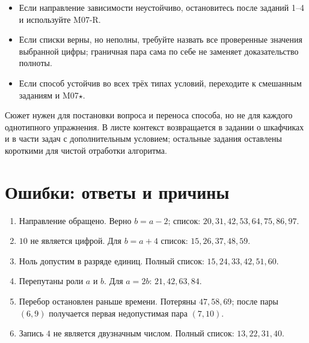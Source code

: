 \begin{teacherbox}
  \begin{itemize}
    \item Если направление зависимости неустойчиво, остановитесь после
      заданий 1--4 и используйте M07-R.
    \item Если списки верны, но неполны, требуйте назвать все проверенные
      значения выбранной цифры; граничная пара сама по себе не заменяет
      доказательство полноты.
    \item Если способ устойчив во всех трёх типах условий, переходите к
      смешанным заданиям и M07\(\star\).
  \end{itemize}
\end{teacherbox}

\begin{teacherbox}
  Сюжет нужен для постановки вопроса и переноса способа, но не для каждого
  однотипного упражнения. В листе контекст возвращается в задании о шкафчиках
  и в части задач с дополнительным условием; остальные задания оставлены
  короткими для чистой отработки алгоритма.
\end{teacherbox}

\section{Ошибки: ответы и причины}

\begin{enumerate}
  \item Направление обращено. Верно \(b=a-2\); список:
    \(20,31,42,53,64,75,86,97\).
  \item \(10\) не является цифрой. Для \(b=a+4\) список:
    \(15,26,37,48,59\).
  \item Ноль допустим в разряде единиц. Полный список:
    \(15,24,33,42,51,60\).
  \item Перепутаны роли \(a\) и \(b\). Для \(a=2b\): \(21,42,63,84\).
  \item Перебор остановлен раньше времени. Потеряны \(47,58,69\); после
    пары \((6,9)\) получается первая недопустимая пара \((7,10)\).
  \item Запись \(4\) не является двузначным числом. Полный список:
    \(13,22,31,40\).
\end{enumerate}


